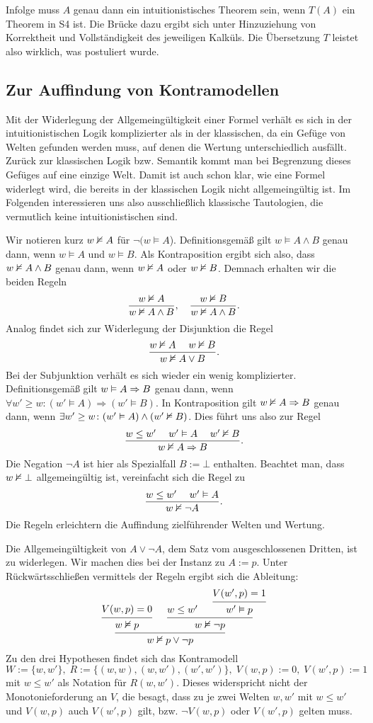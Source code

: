 \noindent
Infolge muss $A$ genau dann ein intuitionistisches Theorem sein,
wenn $T(A)$ ein Theorem in S4 ist. Die Brücke dazu ergibt sich
unter Hinzuziehung von Korrektheit und Vollständigkeit des jeweiligen
Kalküls. Die Übersetzung $T$ leistet also wirklich, was postuliert
wurde.

\subsection{Zur Auffindung von Kontramodellen}

Mit der Widerlegung der Allgemeingültigkeit einer Formel verhält es sich
in der intuitionistischen Logik komplizierter als in der klassischen,
da ein Gefüge von Welten gefunden werden muss, auf denen die Wertung
unterschiedlich ausfällt. Zurück zur klassischen Logik bzw.
Semantik kommt man bei Begrenzung dieses Gefüges auf eine einzige Welt.
Damit ist auch schon klar, wie eine Formel widerlegt wird, die bereits
in der klassischen Logik nicht allgemeingültig ist. Im Folgenden
interessieren uns also ausschließlich klassische Tautologien, die
vermutlich keine intuitionistischen sind.

Wir notieren kurz $w\nvDash A$ für $\lnot (w\models A$).
Definitionsgemäß gilt $w\models A\land B$ genau dann, wenn
$w\models A$ und $w\models B$. Als Kontraposition ergibt sich also,
dass $w\nvDash A\land B$ genau dann, wenn $w\nvDash A$ oder
$w\nvDash B$. Demnach erhalten wir die beiden Regeln
\[\dfrac{w\nvDash A}{w\nvDash A\land B},\quad \dfrac{w\nvDash B}{w\nvDash A\land B}.\]
Analog findet sich zur Widerlegung der Disjunktion die Regel
\[\dfrac{w\nvDash A\quad\; w\nvDash B}{w\nvDash A\lor B}.\]
Bei der Subjunktion verhält es sich wieder ein wenig komplizierter.
Definitionsgemäß gilt $w\vDash A\Rightarrow B$ genau dann, wenn
$\forall w'\ge w\colon (w'\models A)\Rightarrow (w'\models B)$. In
Kontraposition gilt $w\nvDash A\Rightarrow B$ genau dann,
wenn $\exists w'\ge w\colon (w'\vDash A)\land (w'\nvDash B)$. Dies
führt uns also zur Regel
\[\frac{w\le w'\quad\; w'\vDash A\quad\; w'\nvDash B}{w\nvDash A\Rightarrow B}.\]
Die Negation $\lnot A$ ist hier als Spezialfall $B:=\bot$ enthalten.
Beachtet man, dass $w\nvDash\bot$ allgemeingültig ist, vereinfacht sich
die Regel zu
\[\frac{w\le w'\quad\; w'\vDash A}{w\nvDash\lnot A}.\]
Die Regeln erleichtern die Auffindung zielführender Welten und
Wertung.

 Die Allgemeingültigkeit von $A\lor\lnot A$, dem
Satz vom ausgeschlossenen Dritten, ist zu widerlegen. Wir machen dies
bei der Instanz zu $A:=p$. Unter Rückwärtsschließen vermittels der Regeln
ergibt sich die Ableitung:
\[\begin{prooftree}
    \hypo{V(w,p)=0}
  \infer1{w\refutes p}
    \hypo{w\le w'}
      \hypo{V(w',p)=1}
    \infer1{w'\models p}
  \infer2{w\refutes\lnot p}
\infer2{w\refutes p\lor\lnot p}
\end{prooftree}\]
Zu den drei Hypothesen findet sich das Kontramodell
\[W:=\{w,w'\},\;R := \{(w,w),(w,w'),(w',w')\},\;V(w,p):=0,\;V(w',p):=1\]
mit $w\le w'$ als Notation für $R(w,w')$. Dieses widerspricht nicht der
Monotonieforderung an $V$, die besagt, dass zu je zwei Welten $w,w'$
mit $w\le w'$ und $V(w,p)$ auch $V(w',p)$ gilt, bzw. $\lnot V(w,p)$
oder $V(w',p)$ gelten muss.

